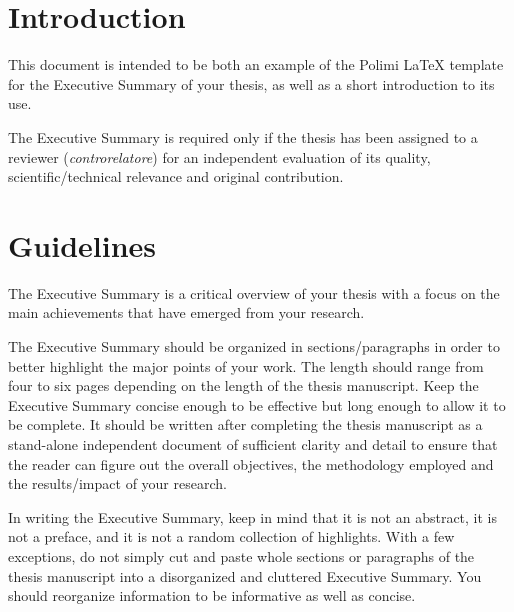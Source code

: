 \documentclass[11pt,a4paper,twocolumn]{article}
\begin{document}



\section{Introduction}
\label{sec:introduction}

This document is intended to be both an example of the Polimi \LaTeX{} template for the Executive Summary
of your thesis, as well as a short introduction to its use.

The Executive Summary is required only
if the thesis has been assigned to a reviewer (\textit{controrelatore})
for an independent evaluation of its quality, scientific/technical relevance and original contribution.

\section{Guidelines}
\label{sec:guidelines}

The Executive Summary is a critical overview of your thesis
with a focus on the main achievements that have emerged from your research.

The Executive Summary should be organized in sections/paragraphs
in order to better highlight the major points of your work.
The length should range from four to six pages depending on the length of the thesis manuscript.
Keep the Executive Summary concise enough to be effective but long enough to allow it to be complete.
It should be written after completing the thesis manuscript as a stand-alone independent document
of sufficient clarity and detail to ensure that the reader can figure out the overall objectives,
the methodology employed and the results/impact of your research.

In writing the Executive Summary, keep in mind that it is not an abstract, it is not a preface,
and it is not a random collection of highlights.
With a few exceptions, do not simply cut and paste whole sections or paragraphs of the thesis manuscript
into a disorganized and cluttered Executive Summary.
You should reorganize information to be informative as well as concise.
\end{document}
